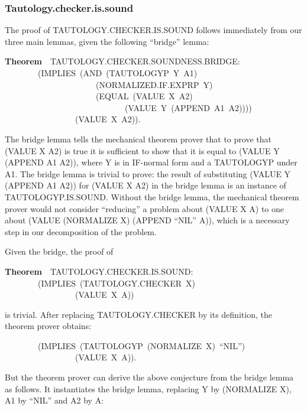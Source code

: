 \documentclass[10pt]{book}
\newenvironment{pubasis}{\begin{flushleft}}{\end{flushleft}}
\newcommand{\axiomordefinition}[1]{\vspace{6pt}\Large\textsf{\textbf{#1}}\normalsize}
\begin{document}
\subsubsection{Tautology.checker.is.sound}
The proof of TAUTOLOGY.CHECKER.IS.SOUND
follows immediately from our three main lemmas, given the following
``bridge'' lemma:
\begin{pubasis}
\axiomordefinition{Theorem}~~TAUTOLOGY.CHECKER.SOUNDNESS.BRIDGE:\\
~~~~~~~~(IMPLIES~(AND~(TAUTOLOGYP~Y~A1)\\
~~~~~~~~~~~~~~~~~~~~~~(NORMALIZED.IF.EXPRP~Y)\\
~~~~~~~~~~~~~~~~~~~~~~(EQUAL~(VALUE~X~A2)\\
~~~~~~~~~~~~~~~~~~~~~~~~~~~~~(VALUE~Y~(APPEND~A1~A2))))\\
~~~~~~~~~~~~~~~~~(VALUE~X~A2)).\\
\end{pubasis}
The bridge lemma tells the mechanical theorem prover that to prove
that (VALUE X A2) is true it is sufficient to show that it is
equal to (VALUE Y (APPEND A1 A2)), where Y is in IF-normal form
and a TAUTOLOGYP under A1.  The bridge lemma is trivial to prove:
the result of substituting (VALUE Y (APPEND A1 A2)) for (VALUE X A2) in the bridge lemma is
an instance of TAUTOLOGYP.IS.SOUND.
Without the bridge lemma, the mechanical theorem prover would not
consider ``reducing'' a problem about (VALUE X A) to one about
(VALUE (NORMALIZE X) (APPEND ``NIL'' A)), which is a necessary step in our
decomposition of the problem.

Given the bridge, the proof of
\begin{pubasis}
\axiomordefinition{Theorem}~~TAUTOLOGY.CHECKER.IS.SOUND:\\
~~~~~~~~(IMPLIES~(TAUTOLOGY.CHECKER~X)\\
~~~~~~~~~~~~~~~~~(VALUE~X~A))\\
\end{pubasis}
is trivial.  After replacing TAUTOLOGY.CHECKER by its definition,
the theorem prover obtains:
\begin{pubasis}
~~~~~~~~(IMPLIES~(TAUTOLOGYP~(NORMALIZE~X)~``NIL'')\\
~~~~~~~~~~~~~~~~~(VALUE~X~A)).\\
\end{pubasis}
But the theorem prover can derive the above conjecture
from the bridge lemma as follows.
It instantiates the bridge lemma, replacing Y by (NORMALIZE X),
A1 by ``NIL'' and A2 by A:
\end{document}

